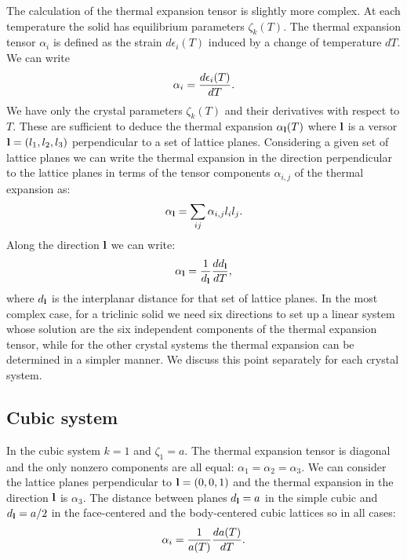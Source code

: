\documentclass[12pt,a4paper]{article}
\begin{document}
The calculation of the thermal expansion tensor is slightly more
complex. At each temperature the solid has equilibrium parameters
$\zeta_k(T)$. The thermal expansion tensor $\alpha_{i}$ is defined 
as the strain $d\epsilon_{i}(T)$ induced by a change of temperature $dT$. 
We can write
\begin{equation}
\alpha_{i} = {d \epsilon_{i}(T) \over  d T }.
\end{equation}
We have only the crystal parameters $\zeta_k (T)$ and their derivatives
with respect to $T$. These are sufficient to deduce the thermal expansion
$\alpha_{\bf l}(T)$ where ${\bf l}$ is a versor ${\bf l}=(l_1,l_2,l_3)$ 
perpendicular to a set of lattice planes. Considering 
a given set of lattice planes we can write the thermal expansion in
the direction perpendicular to the lattice planes in terms of the tensor 
components $\alpha_{i,j}$
of the thermal expansion as:
\begin{equation}
\alpha_{{\bf l}} = \sum_{ij} \alpha_{i,j} l_i l_j.
\end{equation}
Along the direction ${\bf l}$ we can write:
\begin{equation}
\alpha_{{\bf l}} = {1 \over d_{\bf l}} {d d_{\bf l} \over d T},
\end{equation}
where $d_{\bf l}$ is the interplanar distance for that set of lattice planes.
In the most complex case, for a triclinic solid we need six directions
to set up a linear system whose solution are the six independent components
of the thermal expansion tensor, while for the other crystal systems 
the thermal expansion can be determined in a simpler manner.
We discuss this point separately for each crystal system.

\subsection{\color{web-blue}Cubic system}
In the cubic system $k=1$ and $\zeta_1=a$. 
The thermal expansion tensor is diagonal and the only nonzero components
are all equal: $\alpha_1=\alpha_2=\alpha_3$. We can consider the 
lattice planes perpendicular to ${\bf l}=(0,0,1)$ and the thermal expansion
in the direction ${\bf l}$ is $\alpha_3$. The distance between planes
$d_{\bf l}=a$ in the simple cubic and $d_{\bf l}=a/2$ in the face-centered
and the body-centered cubic lattices so in all cases:  
\begin{equation}
\alpha_{i} =  {1\over a(T) } {d a(T) \over dT}.
\end{equation}
\end{document}
